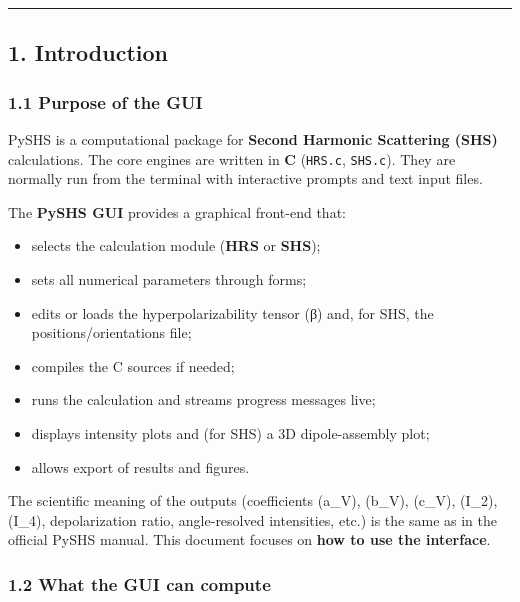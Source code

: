 \begin{center}\rule{0.5\linewidth}{0.5pt}\end{center}

\hypertarget{introduction}{%
\subsection{1. Introduction}\label{introduction}}

\hypertarget{purpose-of-the-gui}{%
\subsubsection{1.1 Purpose of the GUI}\label{purpose-of-the-gui}}

PySHS is a computational package for \textbf{Second Harmonic Scattering
(SHS)} calculations. The core engines are written in \textbf{C}
(\texttt{HRS.c}, \texttt{SHS.c}). They are normally run from the
terminal with interactive prompts and text input files.

The \textbf{PySHS GUI} provides a graphical front-end that:

\begin{itemize}
\tightlist
\item
  selects the calculation module (\textbf{HRS} or \textbf{SHS});
\item
  sets all numerical parameters through forms;
\item
  edits or loads the hyperpolarizability tensor (β) and, for SHS, the
  positions/orientations file;
\item
  compiles the C sources if needed;
\item
  runs the calculation and streams progress messages live;
\item
  displays intensity plots and (for SHS) a 3D dipole-assembly plot;
\item
  allows export of results and figures.
\end{itemize}

The scientific meaning of the outputs (coefficients (a\_V), (b\_V),
(c\_V), (I\_2), (I\_4), depolarization ratio, angle-resolved
intensities, etc.) is the same as in the official PySHS manual. This
document focuses on \textbf{how to use the interface}.

\hypertarget{what-the-gui-can-compute}{%
\subsubsection{1.2 What the GUI can
compute}\label{what-the-gui-can-compute}}

